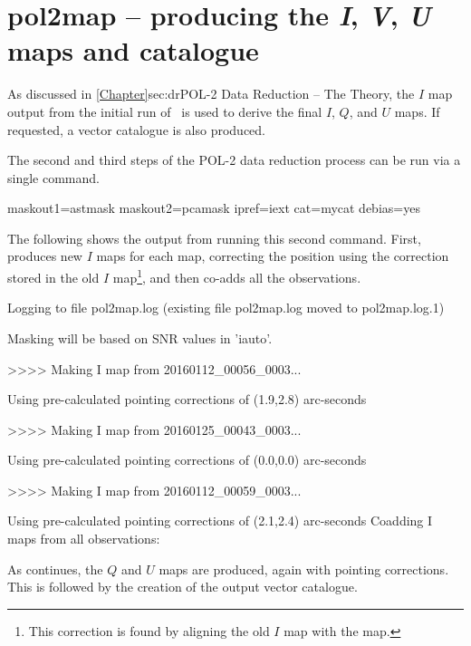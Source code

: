 \section{pol2map -- producing the \textit{I}, \textit{V}, \textit{U} maps and catalogue}
\label{sec:how-step23}

As discussed in \cref{Chapter}{sec:dr}{POL-2 Data Reduction -- The
  Theory}, the $I$ map output from the initial run of \poltwomap\ is used to
derive the final $I$, $Q$, and $U$ maps. If requested, a vector catalogue is
also produced.

The second and third steps of the POL-2 data reduction process can be
run via a single command.

\begin{terminalv}
          maskout1=astmask maskout2=pcamask ipref=iext cat=mycat debias=yes
\end{terminalv}

The following shows the output from running this second 
command. First,  produces new $I$ maps for each map, correcting
the position using the correction stored in the old $I$
map\footnote{This correction is found by aligning the old $I$ map with the
 map.}, and then co-adds all the observations.

\begin{terminalv}
Logging to file pol2map.log
(existing file pol2map.log moved to pol2map.log.1)

Masking will be based on SNR values in 'iauto'.

>>>>   Making I map from 20160112_00056_0003...

   Using pre-calculated pointing corrections of (1.9,2.8) arc-seconds

>>>>   Making I map from 20160125_00043_0003...

   Using pre-calculated pointing corrections of (0.0,0.0) arc-seconds

>>>>   Making I map from 20160112_00059_0003...

   Using pre-calculated pointing corrections of (2.1,2.4) arc-seconds
Coadding I maps from all observations:
\end{terminalv}

As  continues, the $Q$ and $U$ maps are produced, again with
pointing corrections. This is followed by the creation of the output
vector catalogue.

